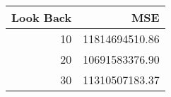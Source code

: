 \begin{tabular}{rr}
    \toprule
    Look Back & MSE \\
    \midrule
    10 & 11814694510.86 \\
    20 & 10691583376.90 \\
    30 & 11310507183.37 \\
    \bottomrule
\end{tabular}
